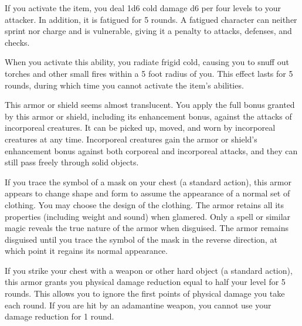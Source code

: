 If you activate the item, you deal 1d6 cold damage \add d6 per four levels to your attacker.
In addition, it is fatigued for 5 rounds.
A fatigued character can neither sprint nor charge and is vulnerable, giving it a  penalty to attacks, defenses, and checks.

When you activate this ability, you radiate frigid cold, causing you to snuff out torches and other small fires within a 5 foot radius of you.
This effect lasts for 5 rounds, during which time you cannot activate the item's abilities.


 This armor or shield seems almost translucent.
You apply the full bonus granted by this armor or shield, including its enhancement bonus, against the attacks of incorporeal creatures.
It can be picked up, moved, and worn by incorporeal creatures at any time.
Incorporeal creatures gain the armor or shield's enhancement bonus against both corporeal and incorporeal attacks, and they can still pass freely through solid objects.


 If you trace the symbol of a mask on your chest (a standard action), this armor appears to change shape and form to assume the appearance of a normal set of clothing.
You may choose the design of the clothing.
The armor retains all its properties (including weight and sound) when glamered.
Only a  spell or similar magic reveals the true nature of the armor when disguised.
The armor remains disguised until you trace the symbol of the mask in the reverse direction, at which point it regains its normal appearance.


 If you strike your chest with a weapon or other hard object (a standard action), this armor grants you physical damage reduction equal to half your level for 5 rounds.
This allows you to ignore the first points of physical damage you take each round.
If you are hit by an adamantine weapon, you cannot use your damage reduction for 1 round.


